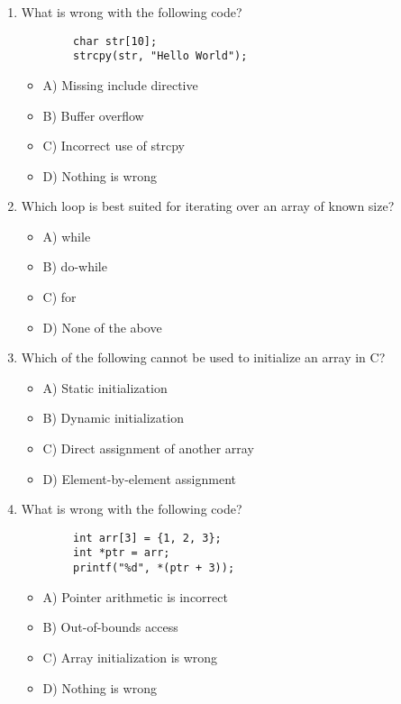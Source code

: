 \documentclass[a4paper,12pt]{article}
\begin{document}
\begin{enumerate}
    \item What is wrong with the following code?

    \lstset{language=C}
    \begin{lstlisting}
        char str[10];
        strcpy(str, "Hello World");
    \end{lstlisting}    
    
    \begin{itemize}
        \item A) Missing include directive
        \item B) Buffer overflow
        \item C) Incorrect use of strcpy
        \item D) Nothing is wrong
    \end{itemize}

    \item Which loop is best suited for iterating over an array of known size?
    \begin{itemize}
        \item A) while
        \item B) do-while
        \item C) for
        \item D) None of the above
    \end{itemize}

    \item Which of the following cannot be used to initialize an array in C?
    \begin{itemize}
        \item A) Static initialization
        \item B) Dynamic initialization
        \item C) Direct assignment of another array
        \item D) Element-by-element assignment
    \end{itemize}

    \item What is wrong with the following code?

    \lstset{language=C}
    \begin{lstlisting}
        int arr[3] = {1, 2, 3};
        int *ptr = arr;
        printf("%d", *(ptr + 3));
    \end{lstlisting}

    \begin{itemize}
        \item A) Pointer arithmetic is incorrect
        \item B) Out-of-bounds access
        \item C) Array initialization is wrong
        \item D) Nothing is wrong
    \end{itemize}


\end{enumerate}
\end{document}
